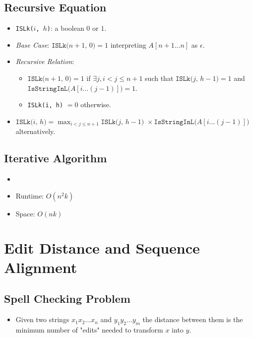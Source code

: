\subsection{Recursive Equation}
\begin{itemize}
    \item \texttt{ISLk($i$, $h$)}: a boolean $0$ or $1$.
    \item \textit{Base Case}: $\texttt{ISLk($n + 1$, $0$)} = 1$ interpreting $A[n + 1...n]$ as $\epsilon$.
    \item \textit{Recursive Relation}:
    \begin{itemize}
        \item $\texttt{ISLk($n + 1$, $0$)} = 1$ if $\exists j, i < j \leq n + 1$ such that $\texttt{ISLk($j$, $h - 1$)} = 1$ and $\texttt{IsStringInL($A[i...(j - 1)]$)} = 1$.
        \item \texttt{ISLk(i, h)} $= 0$ otherwise.
    \end{itemize}
    \item $\texttt{ISLk($i$, $h$)} = \max_{i < j \leq n + 1}\texttt{ISLk($j$, $h - 1$) } \times \texttt{IsStringInL($A[i...(j - 1)]$)}$ alternatively.
\end{itemize}

\subsection{Iterative Algorithm}
\begin{itemize}
    \item[] 
    \item Runtime: $O(n^2k)$ 
    \item Space: $O(nk)$ 
\end{itemize}

\section{Edit Distance and Sequence Alignment}

\subsection{Spell Checking Problem}
\begin{itemize}
    \item Given two strings $x_1x_2...x_n$ and $y_1y_2...y_m$ the distance between them is the minimum number of "edits" needed to transform $x$ into $y$.
\end{itemize}

